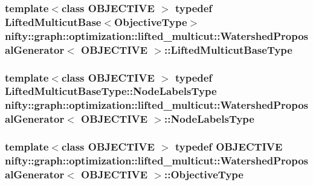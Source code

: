 \subsubsection[{Lifted\+Multicut\+Base\+Type}]{\setlength{\rightskip}{0pt plus 5cm}template$<$class O\+B\+J\+E\+C\+T\+I\+V\+E $>$ typedef {\bf Lifted\+Multicut\+Base}$<${\bf Objective\+Type}$>$ {\bf nifty\+::graph\+::optimization\+::lifted\+\_\+multicut\+::\+Watershed\+Proposal\+Generator}$<$ O\+B\+J\+E\+C\+T\+I\+V\+E $>$\+::{\bf Lifted\+Multicut\+Base\+Type}}\label{classnifty_1_1graph_1_1optimization_1_1lifted__multicut_1_1WatershedProposalGenerator_a8bc07006f85d4302673522c0cfc07e3e}
\hypertarget{classnifty_1_1graph_1_1optimization_1_1lifted__multicut_1_1WatershedProposalGenerator_a9b84800a88ae0384cf729f345d7834da}{}
\subsubsection[{Node\+Labels\+Type}]{\setlength{\rightskip}{0pt plus 5cm}template$<$class O\+B\+J\+E\+C\+T\+I\+V\+E $>$ typedef {\bf Lifted\+Multicut\+Base\+Type\+::\+Node\+Labels\+Type} {\bf nifty\+::graph\+::optimization\+::lifted\+\_\+multicut\+::\+Watershed\+Proposal\+Generator}$<$ O\+B\+J\+E\+C\+T\+I\+V\+E $>$\+::{\bf Node\+Labels\+Type}}\label{classnifty_1_1graph_1_1optimization_1_1lifted__multicut_1_1WatershedProposalGenerator_a9b84800a88ae0384cf729f345d7834da}
\hypertarget{classnifty_1_1graph_1_1optimization_1_1lifted__multicut_1_1WatershedProposalGenerator_a6d15e32fd68f785c92ee9ee909e84a4d}{}
\subsubsection[{Objective\+Type}]{\setlength{\rightskip}{0pt plus 5cm}template$<$class O\+B\+J\+E\+C\+T\+I\+V\+E $>$ typedef O\+B\+J\+E\+C\+T\+I\+V\+E {\bf nifty\+::graph\+::optimization\+::lifted\+\_\+multicut\+::\+Watershed\+Proposal\+Generator}$<$ O\+B\+J\+E\+C\+T\+I\+V\+E $>$\+::{\bf Objective\+Type}}\label{classnifty_1_1graph_1_1optimization_1_1lifted__multicut_1_1WatershedProposalGenerator_a6d15e32fd68f785c92ee9ee909e84a4d}


